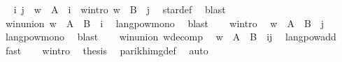 \begin{isabellebody}
\ \isamarkupfalse%
\ i\ j\ \ {\isachardoublequoteopen}w{}\ {\isasymin}\ A\ {\isacharcircum}{\kern0pt}{\isacharcircum}{\kern0pt}\ i{\isachardoublequoteclose}\ \ w{}{\isacharunderscore}{\kern0pt}intro{\isacharcolon}{\kern0pt}\ {\isachardoublequoteopen}w{}\ {\isasymin}\ B\ {\isacharcircum}{\kern0pt}{\isacharcircum}{\kern0pt}\ j{\isachardoublequoteclose}\ \isamarkupfalse%
\ star{\isacharunderscore}{\kern0pt}def\ \isamarkupfalse%
\ blast\isanewline
\ \ \isamarkupfalse%
\ \isamarkupfalse%
\ w{}{\isacharunderscore}{\kern0pt}in{\isacharunderscore}{\kern0pt}union{\isacharcolon}{\kern0pt}\ {\isachardoublequoteopen}w{}\ {\isasymin}\ {\isacharparenleft}{\kern0pt}A\ {\isasymunion}\ B{\isacharparenright}{\kern0pt}\ {\isacharcircum}{\kern0pt}{\isacharcircum}{\kern0pt}\ i{\isachardoublequoteclose}\ \isamarkupfalse%
\ langpow{\isacharunderscore}{\kern0pt}mono\ \isamarkupfalse%
\ blast\isanewline
\ \ \isamarkupfalse%
\ w{}{\isacharunderscore}{\kern0pt}intro\ \isamarkupfalse%
\ {\isachardoublequoteopen}w{}\ {\isasymin}\ {\isacharparenleft}{\kern0pt}A\ {\isasymunion}\ B{\isacharparenright}{\kern0pt}\ {\isacharcircum}{\kern0pt}{\isacharcircum}{\kern0pt}\ j{\isachardoublequoteclose}\ \isamarkupfalse%
\ langpow{\isacharunderscore}{\kern0pt}mono\ \isamarkupfalse%
\ blast\isanewline
\ \ \isamarkupfalse%
\ w{}{\isacharunderscore}{\kern0pt}in{\isacharunderscore}{\kern0pt}union\ w{\isacharunderscore}{\kern0pt}decomp\ \isamarkupfalse%
\ {\isachardoublequoteopen}w\ {\isasymin}\ {\isacharparenleft}{\kern0pt}A\ {\isasymunion}\ B{\isacharparenright}{\kern0pt}\ {\isacharcircum}{\kern0pt}{\isacharcircum}{\kern0pt}\ {\isacharparenleft}{\kern0pt}i{\isacharplus}{\kern0pt}j{\isacharparenright}{\kern0pt}{\isachardoublequoteclose}\ \isamarkupfalse%
\ lang{\isacharunderscore}{\kern0pt}pow{\isacharunderscore}{\kern0pt}add\ \isamarkupfalse%
\ fast\isanewline
\ \ \isamarkupfalse%
\ w{\isacharunderscore}{\kern0pt}intro\ \isamarkupfalse%
\ {\isacharquery}{\kern0pt}thesis\ \isamarkupfalse%
\ parikh{\isacharunderscore}{\kern0pt}img{\isacharunderscore}{\kern0pt}def\ \isamarkupfalse%
\ auto\isanewline

\end{isabellebody}
